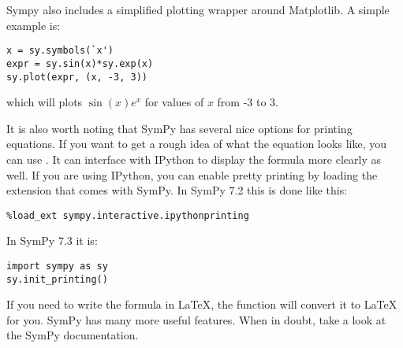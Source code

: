 Sympy also includes a simplified plotting wrapper around Matplotlib.
A simple example is:
\begin{lstlisting}
x = sy.symbols(`x')
expr = sy.sin(x)*sy.exp(x)
sy.plot(expr, (x, -3, 3))
\end{lstlisting}
which will plots $\sin\left(x\right) e^x$ for values of $x$ from -3 to 3.

It is also worth noting that SymPy has several nice options for printing equations.
If you want to get a rough idea of what the equation looks like, you can use .
It can interface with IPython to display the formula more clearly as well.
If you are using IPython, you can enable pretty printing by loading the extension that comes with SymPy.
In SymPy 7.2 this is done like this:
\begin{lstlisting}
%load_ext sympy.interactive.ipythonprinting
\end{lstlisting}
In SymPy 7.3 it is:
\begin{lstlisting}
import sympy as sy
sy.init_printing()
\end{lstlisting}
If you need to write the formula in \LaTeX, the function  will convert it to \LaTeX{} for you.
SymPy has many more useful features.
When in doubt, take a look at the SymPy documentation.